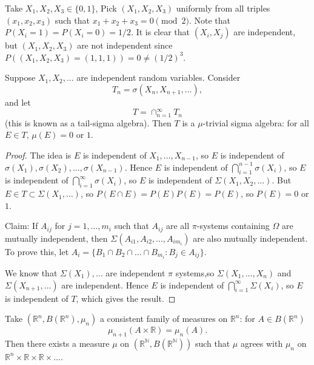\documentclass[11pt]{scrartcl}
\newcommand{\N}{\mathbb{N}}
\newcommand{\R}{\mathbb{R}}
\begin{document}
\begin{example}  Take $X_1, X_2, X_3 \in \{0, 1\}$,  Pick $(X_1, X_2, X_3)$ uniformly from all triples $(x_1, x_2, x_3)$ such that $x_1 + x_2 + x_3 = 0 \pmod 2$.  Note that $P(X_i = 1) = P(X_i = 0) = 1/2$.  It is clear that $(X_i, X_j)$ are independent, but $(X_1, X_2, X_3)$ are not independent since $P((X_1, X_2, X_3) = (1, 1, 1)) = 0 \ne (1/2)^3$.
 \end{example}
\begin{thm}
 Suppose $X_1, X_2, \dots$ are independent random variables.  Consider $$T_n = \sigma(X_n, X_{n+1}, \dots),$$
 and let $$T = \cap_{n=1}^{\infty} T_n$$
 (this is known as a tail-sigma algebra).  Then $T$ is a $\mu$-trivial sigma algebra: for all $E \in T$, $\mu(E) = 0$ or $1$.
 \end{thm}
 \begin{proof}
 The idea is $E$ is independent of $X_1, \dots, X_{n-1}$, so $E$ is independent of $\sigma(X_1), \sigma(X_2), \dots, \sigma(X_{n-1})$.  Hence $E$ is independent of $\bigcap_{i=1}^{n-1}\sigma(X_i)$, so $E$ is independent of $\bigcap_{i=1}^{\infty} \sigma(X_i)$, so $E$ is independent of $\Sigma(X_1, X_2, \dots)$.  But $E \in T \subset \Sigma(X_1, \dots)$, so $P(E \cap E) = P(E)P(E) = P(E)$, so $P(E) = 0$ or $1$.
 
 Claim: If $A_{ij}$ for $j=1, \dots, m_i$ such that $A_{ij}$ are all $\pi$-systems containing $\Omega$ are mutually independent, then $\Sigma(A_{i1}, A_{i2}, \dots, A_{im_i})$ are also mutually independent.  To prove this, let $A_i = \{B_1 \cap B_2 \cap \dots \cap B_{m_i}:B_j \in A_{ij}\}$.
 
 We know that $\Sigma(X_1), \dots $ are independent $\pi$ systems,so $\Sigma(X_1, \dots, X_n)$ and $\Sigma(X_{n+1}, \dots)$ are independent.  Hence $E$ is independent of $\bigcap_{i=1}^\infty \Sigma(X_i)$, so $E$ is independent of $T$, which gives the result. 
 \end{proof}
\begin{thm} Take $(\R^n, B(\R^n), \mu_n)$ a consistent family of measures on $\R^n$: for $A \in B(\R^n)$
$$\mu_{n+1}(A \times \R) = \mu_n(A).$$
Then there exists a measure $\mu$ on $(\R^\N, B(\R^\N))$ such that $\mu$ agrees with $\mu_n$ on $\R^n \times \R \times \R \times \dots$.

\end{thm}
\end{document}
